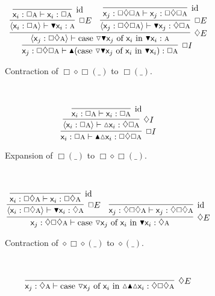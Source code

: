 \begin{figure}
	\centering
	\begin{subfigure}{1\textwidth}
		\[
			\infer[\Box I]{\term{\varj}: \Box\diamond\Box\prop{a} \vdash \boxintro(\caseof{\diaelim \boxelim \varj}{\vari }{\boxelim{\vari }}): \Box\prop{a}}{
				\infer[\diamond E]{\bracket{\term{\varj}: \Box\diamond \prop{a}} \vdash \caseof{\diaelim \boxelim \varj}{\vari }{\boxelim{\vari }}: \prop{a}}{
					\infer[\Box E]{\bracket{\term{\vari }: \Box \prop{a}} \vdash \term{\boxelim \vari }:\prop{a}}{
						\infer[\Ax]{\term{\vari }: \Box\prop{a} \vdash \term{\vari }: \Box\prop{a}}{}
					}
					&
					\infer[\Box E]{\bracket{\term{\varj}:\Box\diamond\Box\prop{a}} \vdash \term{\boxelim \varj}:\diamond\Box\prop{a}}{
						\infer[\Ax]{\term{\varj}: \Box\diamond\Box\prop{a}\vdash\term{\varj}:\Box\diamond\Box\prop{a}}{}
					}
				}
			}
		\]
		\caption{Contraction of $\Box\diamond\Box(\_)$ to $\Box(\_)$.}
		\label{subfigure:triple_law:box_collapse}
	\end{subfigure}\\[\midsep]
	\begin{subfigure}{1\textwidth}
		\[
			\infer[\Box I]{\term{\vari }:\Box\prop{a} \vdash \boxintro\diaintro\term{\vari }:\Box\diamond\Box\prop{a}}{
				\infer[\diamond I]{\bracket{\term{\vari }: \Box\prop{a}} \vdash \diaintro\term{\vari }:\diamond\Box\prop{a}}{
					\infer[\Ax]{\term{\vari }:\Box\prop{a}\vdash \term{\vari }:\Box\prop{a}}{}
				}
			}
		\]
		\caption{Expansion of $\Box(\_)$ to $\Box\diamond\Box(\_)$.}
		\label{subfigure:triple_law:box_expand}
	\end{subfigure}\\[\midsep]
	\begin{subfigure}{1\textwidth}
		\[
			\infer[\diamond E]{\term{\varj}:\diamond\Box\diamond\prop{a} \vdash \caseof{\diaelim \varj}{\vari }{\boxelim \vari }: \diamond\prop{a}}{
				\infer[\Box E]{\bracket{\term{\vari }: \Box\diamond\prop{a}} \vdash \boxelim\term{\vari }: \diamond\prop{a}}{
					\infer[\Ax]{\term{\vari }: \Box\diamond\prop{a} \vdash \term{\vari }: \Box\diamond\prop{a}}{}
				}
				&
				\infer[\Ax]{\term{\varj}: \diamond\Box\diamond\prop{a} \vdash \term{\varj}: \diamond\Box\diamond\prop{a}}{}
			}
		\]
		\caption{Contraction of $\diamond\Box\diamond(\_)$ to $\diamond(\_)$.}
		\label{subfigure:triple_law:diamond_collapse}
	\end{subfigure}\\[\midsep]
	\begin{subfigure}{1\textwidth}
		\[
			\infer[\diamond E]{\term{\varj}: \diamond \prop{a} \vdash \caseof{\diaelim \varj}{\vari }{\diaintro\boxintro\diaintro \vari }:\diamond\Box\diamond\prop{a}}{
}\]
\end{subfigure}
\end{figure}
